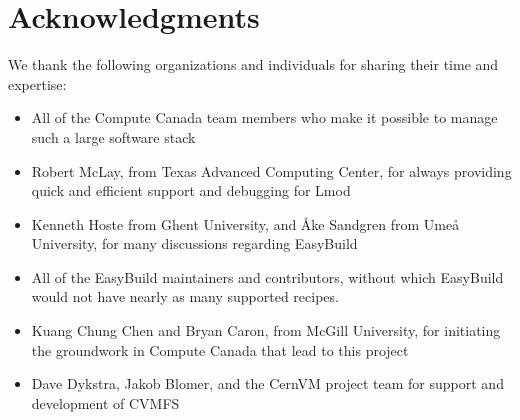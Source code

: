 \documentclass[sigconf]{acmart}
\begin{document}
\section{Acknowledgments}
\label{sec:Acknowledgments}
We thank the following organizations and individuals for sharing their time and expertise:
\begin{itemize}
	\item All of the Compute Canada team members who make it possible to manage such a large software stack
	\item Robert McLay, from Texas Advanced Computing Center, for always providing quick and efficient support and
debugging for Lmod
	\item Kenneth Hoste from Ghent University, and Åke Sandgren from Umeå University, for many discussions
regarding EasyBuild
    \item All of the EasyBuild maintainers and contributors, without which EasyBuild would not have nearly as many supported recipes.
	\item Kuang Chung Chen and Bryan Caron, from McGill University, for initiating the groundwork in Compute Canada that lead to this project
	\item Dave Dykstra, Jakob Blomer, and the CernVM project team for support and development of CVMFS
\end{itemize}

%


\end{document}
